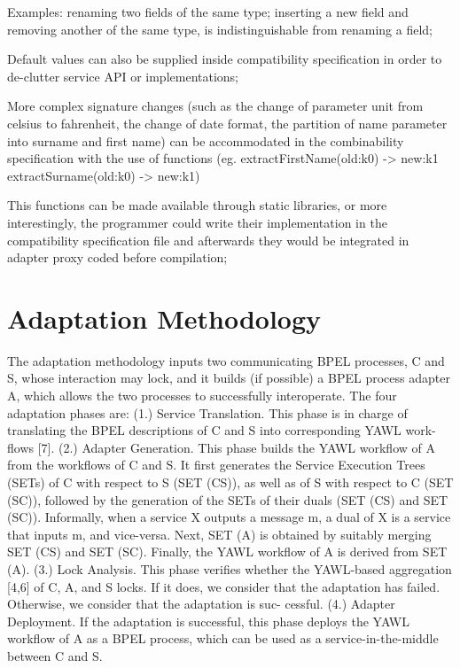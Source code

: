 Examples:
renaming two fields of the same type;
inserting a new field and removing another of the same type, is indistinguishable from renaming a field;

Default values can also be supplied inside compatibility specification in order to de-clutter service API or implementations;

More complex signature changes (such as the change of parameter unit from celsius to fahrenheit, the change of date format, the partition of name parameter into surname and first name)
can be accommodated in the combinability specification with the use of functions (eg. extractFirstName(old:k0) -> new:k1  extractSurname(old:k0) -> new:k1)

This functions can be made available through static libraries, or more interestingly, the programmer could write their implementation in the compatibility specification file
and afterwards they would be integrated in adapter proxy coded before compilation;


\section{Adaptation Methodology} %
\label{sec:adaptation_methodology}

The adaptation methodology inputs two communicating BPEL processes, C
and S, whose interaction may lock, and it builds (if possible) a BPEL process
adapter A, which allows the two processes to successfully interoperate. The four
adaptation phases are: (1.) Service Translation. This phase is in charge of
translating the BPEL descriptions of C and S into corresponding YAWL work-
flows [7]. (2.) Adapter Generation. This phase builds the YAWL workflow of
A from the workflows of C and S. It first generates the Service Execution Trees
(SETs) of C with respect to S (SET (CS)), as well as of S with respect to C
(SET (SC)), followed by the generation of the SETs of their duals (SET (CS)
and SET (SC)). Informally, when a service X outputs a message m, a dual of
X is a service that inputs m, and vice-versa. Next, SET (A) is obtained by
suitably merging SET (CS) and SET (SC). Finally, the YAWL workflow of A
is derived from SET (A). (3.) Lock Analysis. This phase verifies whether the
YAWL-based aggregation [4,6] of C, A, and S locks. If it does, we consider that
the adaptation has failed. Otherwise, we consider that the adaptation is suc-
cessful. (4.) Adapter Deployment. If the adaptation is successful, this phase
deploys the YAWL workflow of A as a BPEL process, which can be used as a
service-in-the-middle between C and S.

